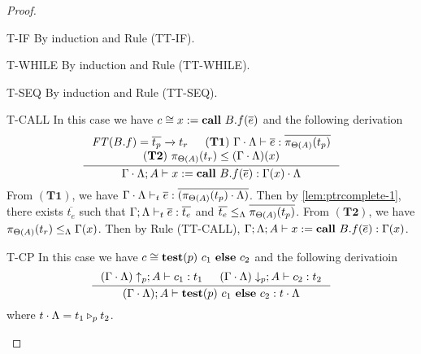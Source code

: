 {{{\begin{proof}
\begin{ProofEnumDesc}
\item[T-IF] By induction and Rule {(TT-IF)}.
\item[T-WHILE] By induction and Rule {(TT-WHILE)}.
\item[T-SEQ] By induction and Rule {(TT-SEQ)}.

\item[T-CALL] In this case we have $c \cong \lcCALL{x}{B.f}{\overline{e}}$ and the following derivation
\begin{equation*}
\inference
{
\FT(B.f) = \overline{t_p} \xrightarrow{} t_r  &
(\mathbf{T1})~\Gamma\cdot \trace \vdash \overline{e} : \overline{\app{t_p}{\Theta(A)}} \\
(\mathbf{T2})~\app{t_r}{\Theta(A)}\leq (\Gamma\cdot\trace)(x)
}
{\Gamma\cdot \trace; A \vdash \lcCALL{x}{B.f}{\overline{e}} : \Gamma(x)\cdot \trace}
\end{equation*}
From $(\mathbf{T1})$, we have $\Gamma\cdot \trace \vdash_{t} \overline{e} : \overline{(\app{t_p}{\Theta(A)}\cdot\trace)}$.
Then by \ref{lem:ptrcomplete-1}, there exists $\overline{t_e}$ such that $\Gamma;\trace \vdash_{t} \overline{e} : \overline{t_e}$ and $\overline{t_e}\leq_{\trace}  \overline{\app{t_p}{\Theta(A)}}$.
From $(\mathbf{T2})$, we have $\app{t_r}{\Theta(A)}\leq_{\trace} \Gamma(x)$.
Then by Rule {(TT-CALL)}, $\Gamma;\trace; A \vdash \lcCALL{x}{B.f}{\overline{e}}: \Gamma(x)$.

\item[T-CP] In this case we have $c\cong \lcCP{p}{c_1}{c_2}$ and the following derivatioin
\begin{equation*}
\inference
{(\Gamma\cdot\trace)\uparrow_{p};  A \vdash c_1 : t_1 &
(\Gamma\cdot\trace)\downarrow_{p}; A \vdash c_2 : t_2}
{(\Gamma\cdot\trace);A\vdash \lcCP{p}{c_1}{c_2} : t\cdot \trace}
\end{equation*}
where $t\cdot \trace = \omerge{p}{t_1}{t_2}$.\\


\end{ProofEnumDesc}
\end{proof}}}}
